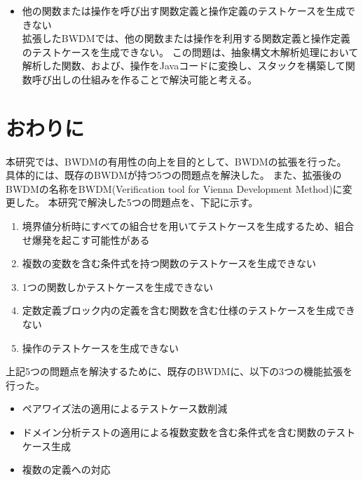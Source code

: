 \documentclass[uplatex, report, a4j, 10pt]{jsbook}
\newcommand\ttt[1]{\texttt{#1}}
\newcommand{\tool}{BWDM}
\newcommand{\toolFullName}{Verification tool for Vienna Development Method}
\begin{document}
\begin{itemize}
  \item 他の関数または操作を呼び出す関数定義と操作定義のテストケースを生成できない\\
        拡張したBWDMでは、他の関数または操作を利用する関数定義と操作定義のテストケースを生成できない。
        この問題は、抽象構文木解析処理において解析した関数、および、操作をJavaコードに変換し、スタックを構築して関数呼び出しの仕組みを作ることで解決可能と考える。
\end{itemize}

\chapter{おわりに} \label{cha:Conclusion}
本研究では、BWDMの有用性の向上を目的として、BWDMの拡張を行った。
具体的には、既存のBWDMが持つ5つの問題点を解決した。
また、拡張後のBWDMの名称を\tool{}(\toolFullName{})に変更した。
本研究で解決した5つの問題点を、下記に示す。

\begin{enumerate}[label=(\alph*)]
  \item 境界値分析時にすべての組合せを用いてテストケースを生成するため、組合せ爆発を起こす可能性がある
  \item 複数の変数を含む条件式を持つ関数のテストケースを生成できない
  \item 1つの関数しかテストケースを生成できない
  \item 定数定義ブロック内の定義を含む関数を含む仕様のテストケースを生成できない
  \item 操作のテストケースを生成できない
\end{enumerate}

上記5つの問題点を解決するために、既存のBWDMに、以下の3つの機能拡張を行った。

\begin{itemize}
  \item ペアワイズ法の適用によるテストケース数削減
  \item ドメイン分析テストの適用による複数変数を含む条件式を含む関数のテストケース生成
  \item 複数の定義への対応
\end{itemize}
\end{document}
